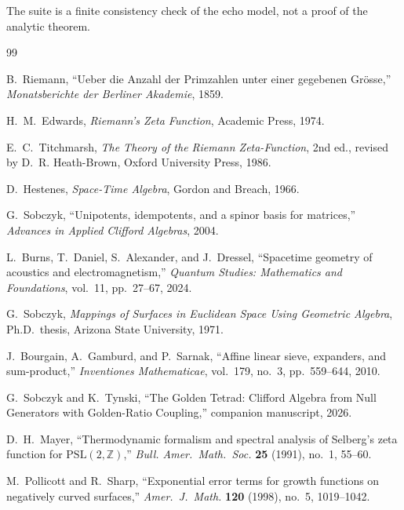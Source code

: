 \documentclass[11pt,a4paper]{article}
\theoremstyle{plain}
\theoremstyle{definition}
\theoremstyle{remark}
\numberwithin{equation}{section}
\begin{document}
The suite is a finite consistency check of the echo model, not a proof of
the analytic theorem.

\clearpage

\begin{thebibliography}{99}

B.~Riemann, ``Ueber die Anzahl der Primzahlen unter einer gegebenen
Gr\"osse,'' \emph{Monatsberichte der Berliner Akademie}, 1859.

H.~M.~Edwards, \emph{Riemann's Zeta Function}, Academic Press, 1974.

E.~C.~Titchmarsh, \emph{The Theory of the Riemann Zeta-Function},
2nd ed., revised by D.~R. Heath-Brown, Oxford University Press, 1986.

D.~Hestenes, \emph{Space-Time Algebra}, Gordon and Breach, 1966.

G.~Sobczyk, ``Unipotents, idempotents, and a spinor basis for
matrices,'' \emph{Advances in Applied Clifford Algebras}, 2004.

L.~Burns, T.~Daniel, S.~Alexander, and J.~Dressel, ``Spacetime geometry
of acoustics and electromagnetism,'' \emph{Quantum Studies: Mathematics
and Foundations}, vol.~11, pp.~27--67, 2024.

G.~Sobczyk, \emph{Mappings of Surfaces in Euclidean Space Using
Geometric Algebra}, Ph.D.\ thesis, Arizona State University, 1971.

J.~Bourgain, A.~Gamburd, and P.~Sarnak, ``Affine linear sieve,
expanders, and sum-product,'' \emph{Inventiones Mathematicae},
vol.~179, no.~3, pp.~559--644, 2010.

G.~Sobczyk and K.~Tynski, ``The Golden Tetrad: Clifford Algebra from
Null Generators with Golden-Ratio Coupling,'' companion manuscript,
2026.

D.~H.~Mayer, ``Thermodynamic formalism and spectral analysis of
Selberg's zeta function for $\mathrm{PSL}(2,\mathbb{Z})$,'' \emph{Bull.
Amer.\ Math.\ Soc.} \textbf{25} (1991), no.~1, 55--60.

M.~Pollicott and R.~Sharp, ``Exponential error terms for growth
functions on negatively curved surfaces,'' \emph{Amer.\ J.\ Math.}
\textbf{120} (1998), no.~5, 1019--1042.


\end{thebibliography}
\end{document}
